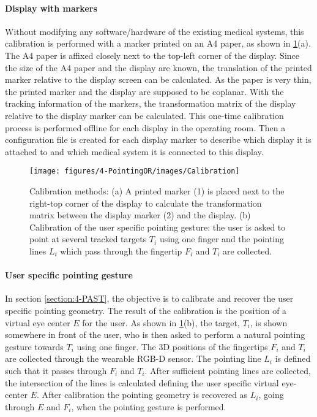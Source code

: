 \paragraph{Display with markers}
Without modifying any software/hardware of the existing medical systems, this calibration is performed with a marker printed on an A4 paper, as shown in  \figurename{\ref{fig:Calibration}(a)}. 
The A4 paper is affixed closely next to the top-left corner of the display. Since the size of the A4 paper and the display are known, the translation of the printed marker relative to the display screen can be calculated. As the paper is very thin, the printed marker and the display are supposed to be coplanar. With the tracking information of the markers, the transformation matrix of the display relative to the display marker can be calculated. This one-time calibration process is performed offline for each display in the operating room. Then a configuration file is created for each display marker to describe which display it is attached to and which medical system it is connected to this display. 
\begin{figure}
	\centering
	\texttt{[image: figures/4-PointingOR/images/Calibration]}
	\caption{Calibration methods: (a) A printed marker (1) is placed next to the right-top corner of the display to calculate the transformation matrix between the display marker (2) and the display. (b) Calibration of the user specific pointing gesture: the user is asked to point at several tracked targets $T_i$ using one finger and the pointing lines $L_i$ which pass through the fingertip $F_i$ and $T_i$ are collected.}
	\label{fig:Calibration}       %
\end{figure}
\paragraph{User specific pointing gesture}
In section \ref{section:4-PAST}, the objective is to calibrate and recover the user specific pointing geometry. The result of the calibration is the position of a virtual eye center $E$ for the user.
As shown in \figurename{ \ref{fig:Calibration}(b)}, the target, $T_i$, is shown somewhere in front of the user, who is then asked to perform a natural pointing gesture towards $T_i$ using one finger. The 3D positions of the fingertips $F_i$ and $T_i$ are collected through the wearable RGB-D sensor. The pointing line $L_i$ is defined such that it passes through $F_i$ and $T_i$. After sufficient pointing lines are collected, the intersection of the lines is calculated defining the user specific virtual eye-center $E$. After calibration the pointing geometry is recovered as $L_{i}$, going through $E$ and  $F_i$, when the pointing gesture is performed.

